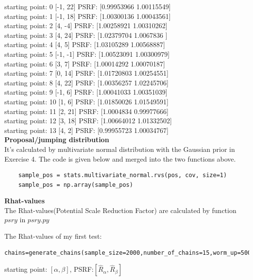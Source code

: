 \documentclass{article}
\begin{document}
starting point: 0 [-1, 22]  PSRF: [0.99953966 1.00115549]\\
starting point: 1 [-1, 18]  PSRF: [1.00300136 1.00043561]\\
starting point: 2 [4, -4]  PSRF: [1.00258921 1.00310262]\\
starting point: 3 [4, 24]  PSRF: [1.02379704 1.0067836 ]\\
starting point: 4 [4, 5]  PSRF: [1.03105289 1.00568887]\\
starting point: 5 [-1, -1]  PSRF: [1.00523091 1.00300979]\\
starting point: 6 [3, 7]  PSRF: [1.00014292 1.00070187]\\
starting point: 7 [0, 14]  PSRF: [1.01720803 1.00254551]\\
starting point: 8 [4, 22]  PSRF: [1.00356257 1.02245706]\\
starting point: 9 [-1, 6]  PSRF: [1.00041033 1.00351039]\\
starting point: 10 [1, 6]  PSRF: [1.01850026 1.01549591]\\
starting point: 11 [2, 21]  PSRF: [1.0004834  0.99977666]\\
starting point: 12 [3, 18]  PSRF: [1.00664012 1.01332502]\\
starting point: 13 [4, 2]  PSRF: [0.99955723 1.00034767]\\


\textbf{Proposal/jumping distribution}\\

It's calculated by multivariate normal distribution with the Gaussian prior in Exercise 4. The code is given below and merged into the two functions above.
\begin{verbatim}  
    sample_pos = stats.multivariate_normal.rvs(pos, cov, size=1)
    sample_pos = np.array(sample_pos)
\end{verbatim}

\textbf{Rhat-values}\\
The Rhat-values(Potential Scale Reduction Factor) are calculated by function $psry$  in $psry.py$

The Rhat-values of my first test:

\begin{verbatim} 
chains=generate_chains(sample_size=2000,number_of_chains=15,worm_up=500)
\end{verbatim}

starting point: $[\alpha,\beta]$, PSRF:$[\hat{R}_{\alpha},\hat{R}_{\beta}]$\\
 
\end{document}
